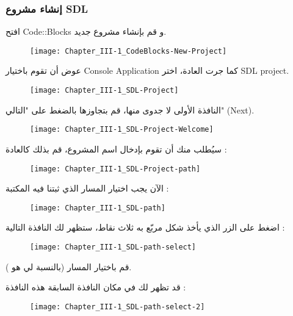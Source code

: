 \subsubsection{إنشاء مشروع \textenglish{SDL}}

افتح
\textenglish{Code::Blocks}
و قم بإنشاء مشروع جديد.

\begin{figure}[H]
	\centering
	\texttt{[image: Chapter\_III-1\_CodeBlocks-New-Project]}
\end{figure}


عوض أن تقوم باختيار 
\textenglish{Console Application}
كما جرت العادة، اختر 
\textenglish{SDL project}.

\begin{figure}[H]
	\centering
	\texttt{[image: Chapter\_III-1\_SDL-Project]}
\end{figure}

النافذة الأولى لا جدوى منها، قم بتجاوزها بالضغط على "التالي"
(\textenglish{Next}).

\begin{figure}[H]
	\centering
	\texttt{[image: Chapter\_III-1\_SDL-Project-Welcome]}
\end{figure}

سيُطلب منك أن تقوم بإدخال اسم المشروع، قم بذلك كالعادة :

\begin{figure}[H]
	\centering
	\texttt{[image: Chapter\_III-1\_SDL-Project-path]}
\end{figure}

الآن يجب اختيار المسار الذي ثبتنا فيه المكتبة :

\begin{figure}[H]
	\centering
	\texttt{[image: Chapter\_III-1\_SDL-path]}
\end{figure}

اضغط على الزر الذي يأخذ شكل مربّع به ثلاث نقاط، ستظهر لك النافذة التالية :

\begin{figure}[H]
	\centering
	\texttt{[image: Chapter\_III-1\_SDL-path-select]}
\end{figure}

قم باختيار المسار (بالنسبة لي هو
).

قد تظهر لك في مكان النافذة السابقة هذه النافذة :

\begin{figure}[H]
	\centering
	\texttt{[image: Chapter\_III-1\_SDL-path-select-2]}
\end{figure}

